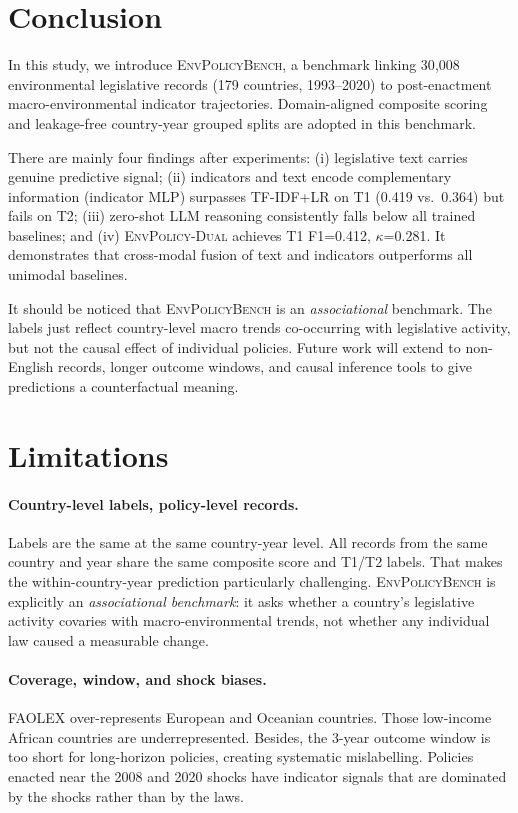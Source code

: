 \documentclass[11pt]{article}
\newcommand{\ours}{\textsc{EnvPolicy-Dual}}
\newcommand{\bench}{\textsc{EnvPolicyBench}}
\begin{document}
\section{Conclusion}
\label{sec:conclusion}

In this study, we introduce \bench, a benchmark linking 30{,}008 environmental legislative records (179 countries, 1993--2020) to post-enactment macro-environmental indicator trajectories. Domain-aligned composite scoring and leakage-free country-year grouped splits are adopted in this benchmark.

There are mainly four findings after experiments: (i) legislative text carries genuine predictive signal; (ii) indicators and text encode complementary information (indicator MLP) surpasses TF-IDF+LR on T1 (0.419 vs.\ 0.364) but fails on T2; (iii) zero-shot LLM reasoning consistently falls below all trained baselines; and (iv) \ours{} achieves T1 F1=0.412, $\kappa$=0.281. It demonstrates that cross-modal fusion of text and indicators outperforms all unimodal baselines.

It should be noticed that \bench{} is an \emph{associational} benchmark. The labels just reflect country-level macro trends co-occurring with legislative activity, but not the causal effect of individual policies. Future work will extend to non-English records, longer outcome windows, and causal inference tools to give predictions a counterfactual meaning.

\section*{Limitations}
\label{sec:lim}

\paragraph{Country-level labels, policy-level records.}
Labels are the same at the same country-year level. All records from the same country and year share the same composite score and T1/T2 labels. That makes the within-country-year prediction particularly challenging. 
\bench{} is explicitly an \emph{associational benchmark}: it asks whether a country's legislative activity covaries with macro-environmental trends, not whether any individual law caused a measurable change.

\paragraph{Coverage, window, and shock biases.}
FAOLEX over-represents European and Oceanian countries. Those low-income African countries are underrepresented. Besides, the 3-year outcome window is too short for long-horizon policies, creating systematic mislabelling. Policies enacted near the 2008 and 2020 shocks have indicator signals that are dominated by the shocks rather than by the laws.
\end{document}

